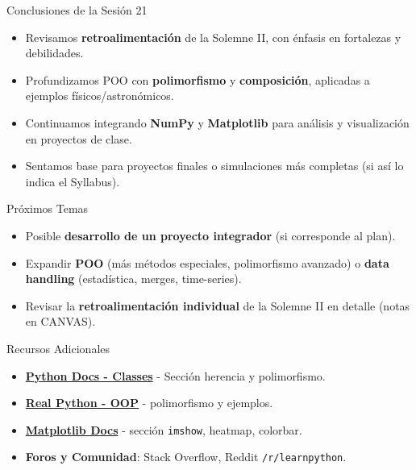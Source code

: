 \documentclass[10pt]{beamer}
\begin{document}
\begin{frame}{Conclusiones de la Sesión 21}
  \begin{itemize}
    \item Revisamos \textbf{retroalimentación} de la Solemne II, con énfasis en fortalezas y debilidades.
    \item Profundizamos POO con \textbf{polimorfismo} y \textbf{composición}, aplicadas a ejemplos físicos/astronómicos.
    \item Continuamos integrando \textbf{NumPy} y \textbf{Matplotlib} para análisis y visualización en proyectos de clase.
    \item Sentamos base para proyectos finales o simulaciones más completas (si así lo indica el Syllabus).
  \end{itemize}
\end{frame}

\begin{frame}{Próximos Temas}
  \begin{itemize}
    \item Posible \textbf{desarrollo de un proyecto integrador} (si corresponde al plan).
    \item Expandir \textbf{POO} (más métodos especiales, polimorfismo avanzado) o \textbf{data handling} (estadística, merges, time-series).
    \item Revisar la \textbf{retroalimentación individual} de la Solemne II en detalle (notas en CANVAS).
  \end{itemize}
\end{frame}

\begin{frame}{Recursos Adicionales}
  \begin{itemize}
    \item \href{https://docs.python.org/3/tutorial/classes.html}{\textbf{Python Docs - Classes}} - Sección herencia y polimorfismo.
    \item \href{https://realpython.com/python3-object-oriented-programming/}{\textbf{Real Python - OOP}} - polimorfismo y ejemplos.
    \item \href{https://matplotlib.org/stable/}{\textbf{Matplotlib Docs}} - sección \texttt{imshow}, heatmap, colorbar.
    \item \textbf{Foros y Comunidad}: Stack Overflow, Reddit \texttt{/r/learnpython}.
  \end{itemize}
\end{frame}
\end{document}
